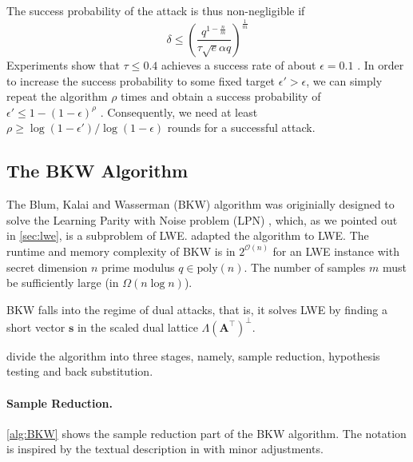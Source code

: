 The success probability of the attack is thus non-negligible if
\begin{equation}
  \delta \leq \left(\frac{q^{1-\frac{n}{m}}}{\tau \sqrt{e} \alpha q}\right)^{\frac{1}{m}}
\end{equation}
Experiments show that $\tau \leq 0.4$ achieves a success rate of about $\epsilon = 0.1$ \cite{AFG13}. In order to increase the success probability to some fixed target $\epsilon' > \epsilon$, we can simply repeat the algorithm $\rho$ times and obtain a success probability of $\epsilon' \leq 1 - (1 - \epsilon)^\rho$ \cite{BBGS19}. Consequently, we need at least $\rho \geq \log(1-\epsilon')/\log(1-\epsilon)$ rounds for a successful attack.

\subsection[The BKW Algorithm]{The BKW Algorithm \cite{BKW03}}
The Blum, Kalai and Wasserman (BKW) algorithm was originially designed to solve the Learning Parity with Noise problem (LPN) \cite{BKW03}, which, as we pointed out in \cref{sec:lwe}, is a subproblem of LWE. \citet{ACFFP15a} adapted the algorithm to LWE. The runtime and memory complexity of BKW is in $2^{\mathcal{O}(n)}$ for an LWE instance with secret dimension $n$ prime modulus $q \in \text{poly}(n)$. The number of samples $m$ must be sufficiently large (in $\Omega(n \log n)$). %

BKW falls into the regime of dual attacks, that is, it solves LWE by finding a short vector $\mathbf{s}$ in the scaled dual lattice $\Lambda(\mathbf{A}^\intercal)^{\perp}$.


\citet{ACFFP15a} divide the algorithm into three stages, namely, sample reduction, hypothesis testing and back substitution.

\paragraph{Sample Reduction.} \cref{alg:BKW} shows the sample reduction part of the BKW algorithm. The notation is inspired by the textual description in \cite{GJS15} with minor adjustments.

